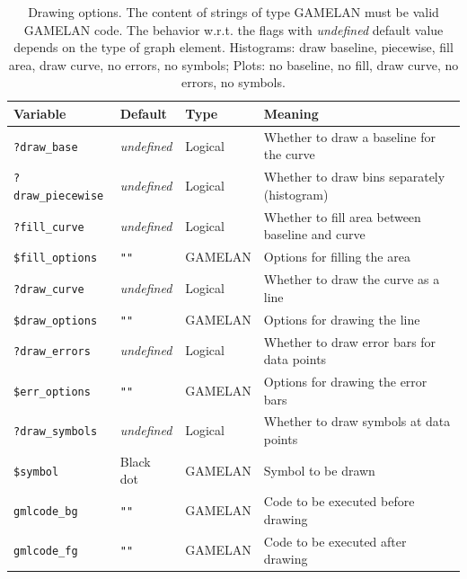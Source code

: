 \documentclass[12pt]{book}
\newcommand{\ttt}[1]{\texttt{#1}}
\begin{document}
\begin{table}
  \caption{Drawing options.  The content of strings of type GAMELAN must be
    valid GAMELAN code.  The behavior w.r.t. the flags with \emph{undefined}
    default value depends on the type of graph element.  Histograms: draw
    baseline, piecewise, fill area, draw curve, no errors, no symbols;  Plots:
    no baseline, no fill, draw curve, no errors, no symbols.}
  \label{tab:drawing-options}

  \begin{center}
    \begin{tabular}{|l|l|l|l|}
      \hline
      Variable & Default & Type & Meaning
      \\
      \hline\hline
      \ttt{?draw\_base}  & \emph{undefined} & Logical &
        Whether to draw a baseline for the curve
      \\
      \hline
      \ttt{?draw\_piecewise}  & \emph{undefined} & Logical &
        Whether to draw bins separately (histogram)
      \\
      \hline
      \ttt{?fill\_curve}  & \emph{undefined} & Logical &
        Whether to fill area between baseline and curve
      \\
      \hline
      \ttt{\$fill\_options} & \ttt{""} & GAMELAN &
        Options for filling the area
      \\
      \hline
      \ttt{?draw\_curve} & \emph{undefined} & Logical &
        Whether to draw the curve as a line
      \\
      \hline
      \ttt{\$draw\_options} & \ttt{""} & GAMELAN &
        Options for drawing the line
      \\
      \hline
      \ttt{?draw\_errors} & \emph{undefined} & Logical &
        Whether to draw error bars for data points
      \\
      \hline
      \ttt{\$err\_options} & \ttt{""} & GAMELAN &
        Options for drawing the error bars
      \\
      \hline
      \ttt{?draw\_symbols} & \emph{undefined} & Logical &
        Whether to draw symbols at data points
      \\
      \hline
      \ttt{\$symbol} & Black dot & GAMELAN &
        Symbol to be drawn
      \\
      \hline
      \ttt{gmlcode\_bg} & \ttt{""} & GAMELAN &
         Code to be executed before drawing
      \\
      \hline
      \ttt{gmlcode\_fg} & \ttt{""} & GAMELAN &
         Code to be executed after drawing
      \\
      \hline
    \end{tabular}
  \end{center}
\end{table}
\end{document}
